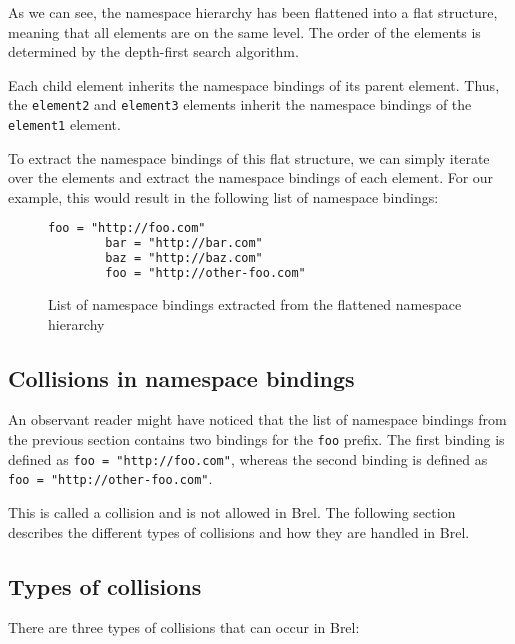 As we can see, the namespace hierarchy has been flattened into a flat structure, meaning that all elements are on the same level.
The order of the elements is determined by the depth-first search algorithm.

Each child element inherits the namespace bindings of its parent element.
Thus, the \texttt{element2} and \texttt{element3} elements inherit the namespace bindings of the \texttt{element1} element.

To extract the namespace bindings of this flat structure, we can simply iterate over the elements and extract the namespace bindings of each element.
For our example, this would result in the following list of namespace bindings:

\begin{figure}
    \caption{List of namespace bindings extracted from the flattened namespace hierarchy}
    \label{fig:custom_namespace_notation_example_flattened_extracted}
    \begin{lstlisting}[language=XML]
        foo = "http://foo.com"
        bar = "http://bar.com"
        baz = "http://baz.com"
        foo = "http://other-foo.com"
    \end{lstlisting}
\end{figure}

\subsection{Collisions in namespace bindings}

An observant reader might have noticed that the list of namespace bindings from the previous section contains two bindings for the \texttt{foo} prefix.
The first binding is defined as \texttt{foo = "http://foo.com"}, whereas the second binding is defined as \texttt{foo = "http://other-foo.com"}.

This is called a collision and is not allowed in Brel.
The following section describes the different types of collisions and how they are handled in Brel.

\subsection{Types of collisions}

There are three types of collisions that can occur in Brel:

